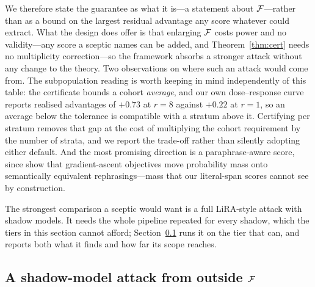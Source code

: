 We therefore state the guarantee as what it is---a statement about $\F$---rather than
as a bound on the largest residual advantage any score whatever could extract. What the
design does offer is that enlarging $\F$ costs power and no validity---any score a sceptic
names can be added, and Theorem~\ref{thm:cert} needs no multiplicity correction---so
the framework absorbs a stronger attack without any change to the theory. Two
observations on where such an attack would come from. The subpopulation reading is
worth keeping in mind independently of this table: the certificate bounds a cohort
\emph{average}, and our own dose--response curve reports realised advantages of
$+0.73$ at $r = 8$ against $+0.22$ at $r = 1$, so an average below the tolerance is
compatible with a stratum above it. Certifying per stratum removes that gap at the
cost of multiplying the cohort requirement by the number of strata, and we report the
trade-off rather than silently adopting either default. And the most promising
direction is a paraphrase-aware score, since \citet{li2026beliefs} show that
gradient-ascent objectives move probability mass onto semantically equivalent
rephrasings---mass that our literal-span scores cannot see by construction.

The strongest comparison a sceptic would want is a full LiRA-style attack with shadow
models. It needs the whole pipeline repeated for every shadow, which the tiers in this
section cannot afford; Section~\ref{sec:exp-lira} runs it on the tier that can, and
reports both what it finds and how far its scope reaches.

\begin{table}[t]
\centering\small
\caption{Attacks from outside the declared class $\F$, run against every
model/subject/seed combination certified at $\eps = 0.2$ for which the attack is
defined. ``observed'' is the fraction
of runs on which the attack's realised advantage exceeds $\eps$; ``null'' is what an
exact binomial calculation predicts for a \emph{clean} subsample of the same size,
averaged over the run-specific sizes. Neither attack beats its own null, so the table
is a null result: it bounds neither how narrow $\F$ is nor how wide. Bold marks an
observed rate above the null.}
\label{tab:outclass}

\end{table}

\subsection{A shadow-model attack from outside $\F$}\label{sec:exp-lira}

